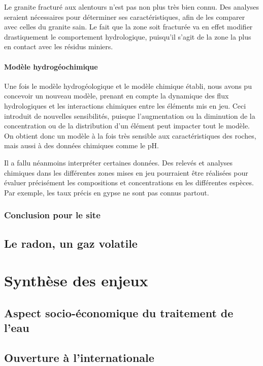 \documentclass{article}
\begin{document}
Le granite fracturé aux alentours n’est pas non plus très bien connu. Des analyses seraient nécessaires pour déterminer ses caractéristiques, afin de les comparer avec celles du granite sain. Le fait que la zone soit fracturée va en effet modifier drastiquement le comportement hydrologique, puisqu’il s’agit de la zone la plus en contact avec les résidus miniers.

\paragraph{Modèle hydrogéochimique}

Une fois le modèle hydrogéologique et le modèle chimique établi, nous avons pu concevoir un nouveau modèle, prenant en compte la dynamique des flux hydrologiques et les interactions chimiques entre les éléments mis en jeu. Ceci introduit de nouvelles sensibilités, puisque l’augmentation ou la diminution de la concentration ou de la distribution d’un élément peut impacter tout le modèle. On obtient donc un modèle à la fois très sensible aux caractéristiques des roches, mais aussi à des données chimiques comme le pH.

Il a fallu néanmoins interpréter certaines données. Des relevés et analyses chimiques dans les différentes zones mises en jeu pourraient être réalisées pour évaluer précisément les compositions et concentrations en les différentes espèces. Par exemple, les taux précis en gypse ne sont pas connus partout.


\subsubsection{Conclusion pour le site}

\subsection{Le radon, un gaz volatile}

\newpage
\section{Synthèse des enjeux}
\subsection{Aspect socio-économique du traitement de l’eau}
\subsection{Ouverture à l’internationale}
\end{document}
